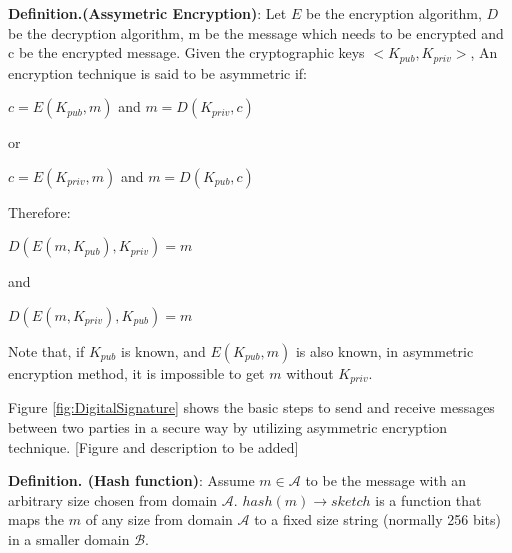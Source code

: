 \textbf{Definition.(Assymetric Encryption)}: Let $E$ be the encryption algorithm, $D$ be the decryption algorithm, m be the message which needs to be encrypted and c be the encrypted message. Given the cryptographic keys $<K_{pub}, K_{priv}>$, An encryption technique is said to be asymmetric if:

\begin{center}
	$c = E(K_{pub},m)$ and  $m = D(K_{priv},c)$
\end{center}
or
\begin{center}
	$c = E(K_{priv},m)$ and  $m = D(K_{pub},c)$
\end{center}
Therefore:
\begin{center}
	$D(E(m,K_{pub}),K_{priv}) = m$ 
\end{center}
and
\begin{center}
	$D(E(m,K_{priv}),K_{pub}) = m$
\end{center}
Note that, if $K_{pub}$ is known, and $E(K_{pub},m)$ is also known, in asymmetric encryption method, it is impossible to get $m$ without $K_{priv}$.

Figure \ref{fig:DigitalSignature} shows the basic steps to send and receive messages between two parties in a secure way by utilizing asymmetric encryption technique. [Figure and description to be added]

\textbf{Definition. (Hash function)}: Assume $m \in \mathcal{A}$ to be the message with an arbitrary size chosen from domain $\mathcal{A}$. $hash(m)\rightarrow sketch$ 
is a function that maps the $m$ of any size from domain $\mathcal{A}$ to a fixed size string (normally 256 bits) in a smaller domain $\mathcal{B}$.


